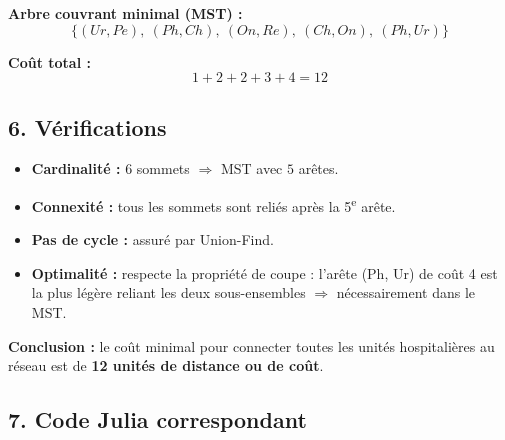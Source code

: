 \textbf{Arbre couvrant minimal (MST) :}
\[
\{ (Ur,Pe),\ (Ph,Ch),\ (On,Re),\ (Ch,On),\ (Ph,Ur) \}
\]

\textbf{Coût total :}
\[
1 + 2 + 2 + 3 + 4 = \boxed{12}
\]

\subsection*{6. Vérifications}

\begin{itemize}
    \item \textbf{Cardinalité :} 6 sommets $\Rightarrow$ MST avec $5$ arêtes.
    \item \textbf{Connexité :} tous les sommets sont reliés après la 5\textsuperscript{e} arête.
    \item \textbf{Pas de cycle :} assuré par Union-Find.
    \item \textbf{Optimalité :} respecte la propriété de coupe : l’arête (Ph, Ur) de coût 4 est la plus légère reliant les deux sous-ensembles $\Rightarrow$ nécessairement dans le MST.
\end{itemize}

\textbf{Conclusion :} le coût minimal pour connecter toutes les unités hospitalières au réseau est de \textbf{12 unités de distance ou de coût}.

\subsection*{7. Code Julia correspondant}

